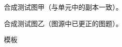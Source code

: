 \begin{figure}[htbp]
\centering
{}
\caption{合成测试图甲（与单元中的副本一致）。}\label{fig:synth-same}
\end{figure}

\begin{figure}[htbp]
\centering
{}
\caption{合成测试图乙（图源中已更正的图题）。}\label{fig:synth-changed}
\end{figure}

\begin{figure}[htbp]\centering{}\caption{模板}\label{fig:appP-dependency}\end{figure}

